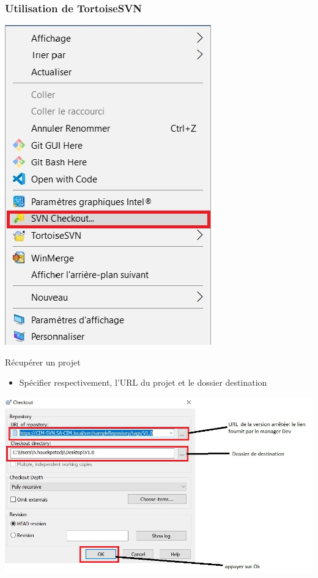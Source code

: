 \documentclass{beamer}
\begin{document}
\begin{frame}
\frametitle{Utilisation de TortoiseSVN}
\includegraphics[scale=0.25]{../images/checkout1.jpg}
\begin{block}{Récupérer un projet }

\begin{itemize}
\item Spécifier respectivement, l'URL du projet et le dossier destination
\end{itemize}
\end{block}
\includegraphics[scale=0.25]{../images/checkout3RC.jpg}
\end{frame}
\end{document}
